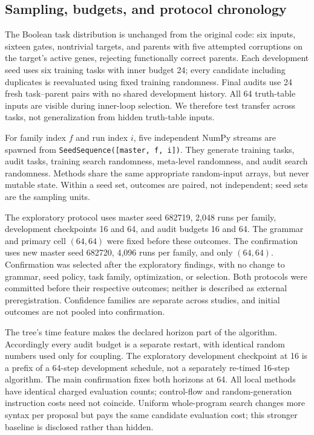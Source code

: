 \subsection{Sampling, budgets, and protocol chronology}
The Boolean task distribution is unchanged from the original code: six inputs, sixteen gates, nontrivial targets, and parents with five attempted corruptions on the target's active genes, rejecting functionally correct parents. Each development seed uses six training tasks with inner budget 24; every candidate including duplicates is reevaluated using fixed training randomness. Final audits use 24 fresh task--parent pairs with no shared development history. All 64 truth-table inputs are visible during inner-loop selection. We therefore test transfer across tasks, not generalization from hidden truth-table inputs.

For family index $f$ and run index $i$, five independent NumPy streams are spawned from \texttt{SeedSequence([master, f, i])}. They generate training tasks, audit tasks, training search randomness, meta-level randomness, and audit search randomness. Methods share the same appropriate random-input arrays, but never mutable state. Within a seed set, outcomes are paired, not independent; seed sets are the sampling units.

The exploratory protocol uses master seed 682719, 2,048 runs per family, development checkpoints 16 and 64, and audit budgets 16 and 64. The grammar and primary cell $(64,64)$ were fixed before these outcomes. The confirmation uses new master seed 682720, 4,096 runs per family, and only $(64,64)$. Confirmation was selected after the exploratory findings, with no change to grammar, seed policy, task family, optimization, or selection. Both protocols were committed before their respective outcomes; neither is described as external preregistration. Confidence families are separate across studies, and initial outcomes are not pooled into confirmation.

The tree's time feature makes the declared horizon part of the algorithm. Accordingly every audit budget is a separate restart, with identical random numbers used only for coupling. The exploratory development checkpoint at 16 is a prefix of a 64-step development schedule, not a separately re-timed 16-step algorithm. The main confirmation fixes both horizons at 64. All local methods have identical charged evaluation counts; control-flow and random-generation instruction costs need not coincide. Uniform whole-program search changes more syntax per proposal but pays the same candidate evaluation cost; this stronger baseline is disclosed rather than hidden.

